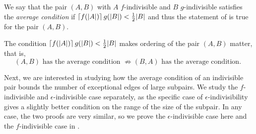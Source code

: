         \begin{definition}
            We say that the pair $(A,B)$ with $A$ $f$-indivisible and $B$ $g$-indivisible satisfies the \emph{average condition} if
            $\left\lceil f(|A|) \right\rceil g(|B|) < \frac{1}{2} |B|$ and thus the statement of  is true for
            the pair $(A,B)$.
        \end{definition}

        \begin{remark}
            The condition $\left\lceil f(|A|) \right\rceil g(|B|) < \frac{1}{2} |B|$ makes ordering of the pair $(A,B)$ matter, that is,
            \[
                (A,B) \text{ has the average condition } \not\Rightarrow (B,A) \text{ has the average condition. }
            \]
        \end{remark}

        Next, we are interested in studying how the average condition of an indivisible pair bounds the number of
        exceptional edges of large subpairs.
        We study the $f$-indivisible and $\epsilon$-indivisible case separately, as the specific case of $\epsilon$-indivisibility gives
        a slightly better condition on the range of the size of the subpair.
        In any case, the two proofs are very similar, so we prove the $\epsilon$-indivisible case here and the
        $f$-indivisible case in .

